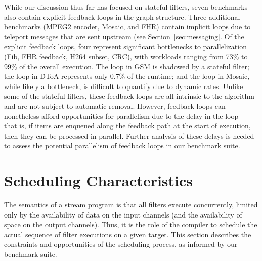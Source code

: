 \myitem {\feedback} While our discussion thus far has focused on
stateful filters, seven benchmarks also contain explicit feedback
loops in the graph structure.  Three additional benchmarks (MPEG2
encoder, Mosaic, and FHR) contain implicit loops due to teleport
messages that are sent upstream (see Section~\ref{sec:messaging}.  Of
the explicit feedback loops, four represent significant bottlenecks to
parallelization (Fib, FHR feedback, H264 subset, CRC), with workloads
ranging from 73\% to 99\% of the overall execution.  The loop in GSM
is shadowed by a stateful filter; the loop in DToA represents only
0.7\% of the runtime; and the loop in Mosaic, while likely a
bottleneck, is difficult to quantify due to dynamic rates.  Unlike
some of the stateful filters, these feedback loops are all intrinsic
to the algorithm and are not subject to automatic removal.  However,
feedback loops can nonetheless afford opportunities for parallelism
due to the delay in the loop -- that is, if items are enqueued along
the feedback path at the start of execution, then they can be
processed in parallel.  Further analysis of these delays is needed to
assess the potential parallelism of feedback loops in our benchmark
suite.


\section{Scheduling Characteristics}

The semantics of a stream program is that all filters execute
concurrently, limited only by the availability of data on the input
channels (and the availability of space on the output channels).
Thus, it is the role of the compiler to schedule the actual sequence
of filter executions on a given target.  This section describes the
constraints and opportunities of the scheduling process, as informed
by our benchmark suite.

